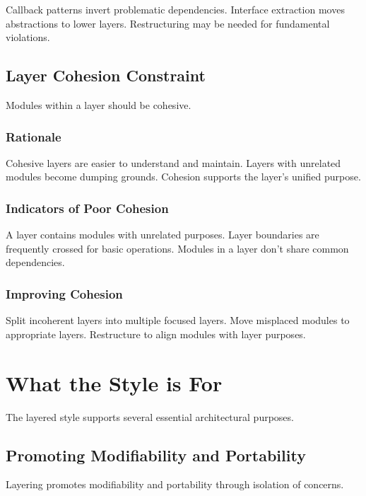 \documentclass[11pt]{article}
\begin{document}
Callback patterns invert problematic dependencies. Interface extraction moves abstractions to lower layers. Restructuring may be needed for fundamental violations.

\subsection{Layer Cohesion Constraint}

Modules within a layer should be cohesive.

\subsubsection{Rationale}

Cohesive layers are easier to understand and maintain. Layers with unrelated modules become dumping grounds. Cohesion supports the layer's unified purpose.

\subsubsection{Indicators of Poor Cohesion}

A layer contains modules with unrelated purposes. Layer boundaries are frequently crossed for basic operations. Modules in a layer don't share common dependencies.

\subsubsection{Improving Cohesion}

Split incoherent layers into multiple focused layers. Move misplaced modules to appropriate layers. Restructure to align modules with layer purposes.

\section{What the Style is For}

The layered style supports several essential architectural purposes.

\subsection{Promoting Modifiability and Portability}

Layering promotes modifiability and portability through isolation of concerns.
\end{document}
